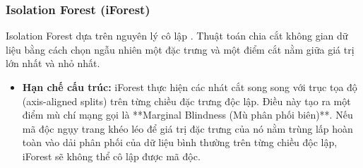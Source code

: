 \documentclass[../main.tex]{subfiles}
\begin{document}
\subsubsection{Isolation Forest (iForest)}
Isolation Forest dựa trên nguyên lý cô lập \cite{liu2008isolation}. Thuật toán chia cắt không gian dữ liệu bằng cách chọn ngẫu nhiên một đặc trưng và một điểm cắt nằm giữa giá trị lớn nhất và nhỏ nhất.
\begin{itemize}
    \item \textbf{Hạn chế cấu trúc:} iForest thực hiện các nhát cắt song song với trục tọa độ (axis-aligned splits) trên từng chiều đặc trưng độc lập. Điều này tạo ra một điểm mù chí mạng gọi là **Marginal Blindness (Mù phân phối biên)**. Nếu mã độc ngụy trang khéo léo để giá trị đặc trưng của nó nằm trùng lấp hoàn toàn vào dải phân phối của dữ liệu bình thường trên từng chiều độc lập, iForest sẽ không thể cô lập được mã độc.
\end{itemize}
\end{document}
